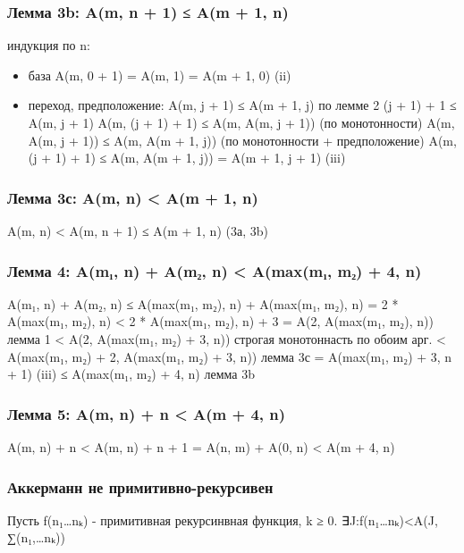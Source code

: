 \documentclass[11pt]{article}
\begin{document}
\subsubsection{Лемма 3b: A(m, n + 1) ≤ A(m + 1, n)}
\label{sec-10-3-6}
индукция по n:
\begin{itemize}
\item база
A(m, 0 + 1) = A(m, 1) = A(m + 1, 0) (ii)
\item переход, предположение: A(m, j + 1) ≤ A(m + 1, j)
по лемме 2 (j + 1) + 1 ≤ A(m, j + 1)
A(m, (j + 1) + 1) ≤ A(m, A(m, j + 1)) (по монотонности)
A(m, A(m, j + 1)) ≤ A(m, A(m + 1, j)) (по монотонности + предположение)
A(m, (j + 1) + 1) ≤ A(m, A(m + 1, j)) = A(m + 1, j + 1) (iii)
\end{itemize}
\subsubsection{Лемма 3с: A(m, n) < A(m + 1, n)}
\label{sec-10-3-7}
A(m, n) < A(m, n + 1) ≤ A(m + 1, n) (3а, 3b)
\subsubsection{Лемма 4: A(m₁, n) + A(m₂, n) < A(max(m₁, m₂) + 4, n)}
\label{sec-10-3-8}
A(m₁, n) + A(m₂, n)
≤ A(max(m₁, m₂), n) + A(max(m₁, m₂), n)
= 2 * A(max(m₁, m₂), n)
< 2 * A(max(m₁, m₂), n) + 3
= A(2, A(max(m₁, m₂), n))     лемма 1
< A(2, A(max(m₁, m₂) + 3, n)) строгая монотоннасть по обоим арг.
< A(max(m₁, m₂) + 2, A(max(m₁, m₂) + 3, n)) лемма 3с
= A(max(m₁, m₂) + 3, n + 1)   (iii)
≤ A(max(m₁, m₂) + 4, n)       лемма 3b
\subsubsection{Лемма 5: A(m, n) + n < A(m + 4, n)}
\label{sec-10-3-9}
A(m, n) + n
< A(m, n) + n + 1
= A(n, m) + A(0, n)
< A(m + 4, n)
\subsubsection{Аккерманн не примитивно-рекурсивен}
\label{sec-10-3-10}
Пусть f(n₁\ldots{}nₖ) - примитивная рекурсинвная функция, k ≥ 0.
∃J:f(n₁\ldots{}nₖ)<A(J, ∑(n₁,\ldots{}nₖ))
\end{document}
